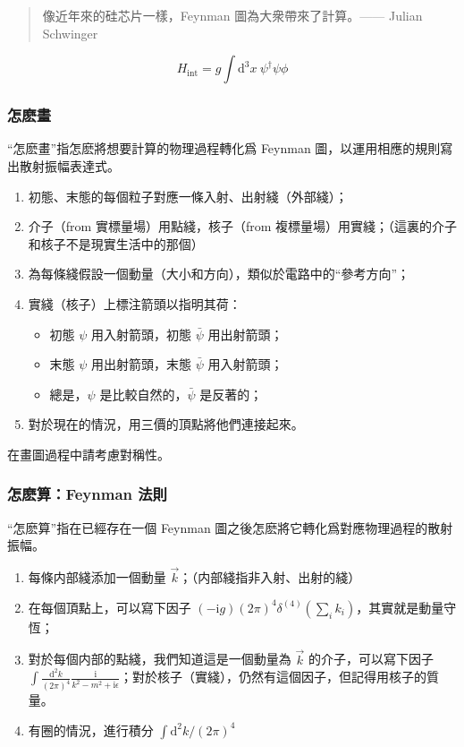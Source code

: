 \documentclass{article}
\begin{document}
\begin{quote}
像近年來的硅芯片一樣，Feynman 圖為大衆帶來了計算。—— Julian Schwinger
\end{quote}

$$H_{\mathrm{int}}=g\int\mathrm{d}^3x\ \psi^{\dagger}\psi\phi$$

\subsubsection{怎麽畫}

“怎麽畫”指怎麽將想要計算的物理過程轉化爲 Feynman 圖，以運用相應的規則寫出散射振幅表達式。

\begin{enumerate}
\item 初態、末態的每個粒子對應一條入射、出射綫（外部綫）；
\item 介子（from 實標量場）用點綫，核子（from 複標量場）用實綫；（這裏的介子和核子不是現實生活中的那個）
\item 為每條綫假設一個動量（大小和方向），類似於電路中的“參考方向”；
\item 實綫（核子）上標注箭頭以指明其荷：
  \begin{itemize}
    \item 初態 $\psi$ 用入射箭頭，初態 $\bar\psi$ 用出射箭頭；
    \item 末態 $\psi$ 用出射箭頭，末態 $\bar\psi$ 用入射箭頭；
    \item 總是，$\psi$ 是比較自然的，$\bar\psi$ 是反著的；
  \end{itemize}
\item 對於現在的情況，用三價的頂點將他們連接起來。
\end{enumerate}

在畫圖過程中請考慮對稱性。

\subsubsection{怎麽算：Feynman 法則}

“怎麽算”指在已經存在一個 Feynman 圖之後怎麽將它轉化爲對應物理過程的散射振幅。

\begin{enumerate}
\item 每條内部綫添加一個動量 $\vec{k}$；（内部綫指非入射、出射的綫）
\item 在每個頂點上，可以寫下因子 $(-\mathrm{i}g)(2\pi)^4\delta^{(4)}\left(\sum_ik_i\right)$，其實就是動量守恆；
\item 對於每個内部的點綫，我們知道這是一個動量為 $\vec{k}$ 的介子，可以寫下因子 $\int\frac{\mathrm{d}^2k}{(2\pi)^4}\frac{\mathrm{i}}{k^2-m^2+\mathrm{i}\epsilon}$；對於核子（實綫），仍然有這個因子，但記得用核子的質量。
\item 有圈的情況，進行積分 $\int\mathrm{d}^2k/(2\pi)^4$
\end{enumerate}
\end{document}
